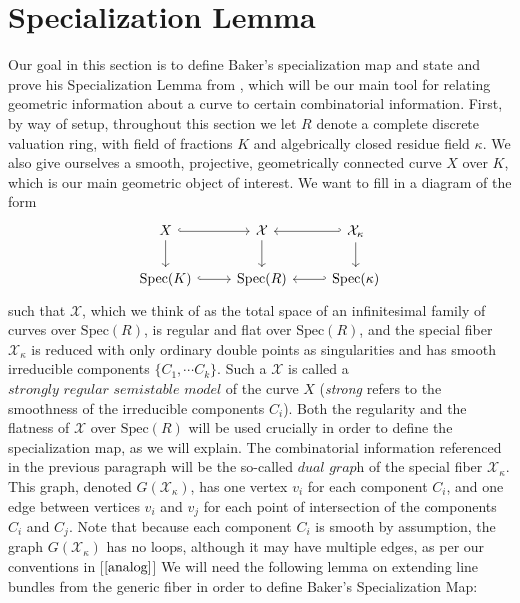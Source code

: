 \documentclass{article}
\begin{document}
\section{Specialization Lemma}
Our goal in this section is to define Baker's specialization map and state and prove his Specialization Lemma from \cite{baker08}, which will be our main tool for relating geometric information about a curve to certain combinatorial information. First, by way of setup, throughout this section we let $R$ denote a complete discrete valuation ring,  with field of fractions $K$ and algebrically closed residue field $\kappa$. We also give ourselves a smooth, projective, geometrically connected curve $X$ over $K$, which is our main geometric object of interest. We want to fill in a diagram of the form
\[
\begin{tikzcd}
X \arrow[d] \arrow[r, hook]    & \mathcal{X} \arrow[d] & \mathcal{X}_{\kappa} \arrow[d] \arrow[l, hook'] \\
\text{Spec}(K) \arrow[r, hook] & \text{Spec}(R)        & \text{Spec}(\kappa) \arrow[l, hook']   \end{tikzcd}
\]
such that $\mathcal{X}$, which we think of as the total space of an infinitesimal family of curves over $\text{Spec}(R)$, is regular and flat over $\text{Spec}(R)$, and the special fiber $\mathcal{X}_{\kappa}$ is reduced with only ordinary double points as singularities and has smooth irreducible components $\{C_1, \cdots C_k\}$. Such a $\mathcal{X}$ is called a $\textit{strongly regular semistable model}$ of the curve $X$ (\textit{strong} refers to the smoothness of the irreducible components $C_i$). Both the regularity and the flatness of $\mathcal{X}$ over $\text{Spec}(R)$ will be used crucially in order to define the specialization map, as we will explain. 
\newline
\newline
The combinatorial information referenced in the previous paragraph will be the so-called $\textit{dual graph}$ of the special fiber $\mathcal{X}_{\kappa}$. This graph, denoted $G(\mathcal{X}_{\kappa})$, has one vertex $v_i$ for each component $C_i$, and one edge between vertices $v_i$ and $v_j$ for each point of intersection of the components $C_i$ and $C_j$. Note that because each component $C_i$ is smooth by assumption, the graph $G(\mathcal{X}_{\kappa})$ has no loops, although it may have multiple edges, as per our conventions in [$\ref{analog}$]
\newline
\newline
We will need the following lemma on extending line bundles from the generic fiber in order to define Baker's Specialization Map:
\end{document}

